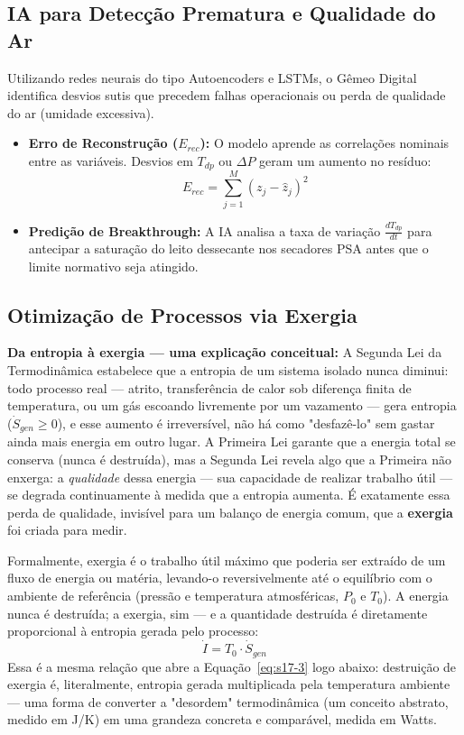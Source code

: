 \documentclass[12pt,a4paper]{article}
\numberwithin{equation}{section}
\numberwithin{table}{section}
\numberwithin{figure}{section}
\begin{document}
\subsection{IA para Detecção Prematura e Qualidade do Ar}

Utilizando redes neurais do tipo Autoencoders e LSTMs, o Gêmeo Digital identifica desvios sutis que precedem falhas operacionais ou perda de qualidade do ar (umidade excessiva).

\begin{itemize}
	\item \textbf{Erro de Reconstrução ($E_{rec}$):}
	O modelo aprende as correlações nominais entre as variáveis. Desvios em $T_{dp}$ ou $\Delta P$ geram um aumento no resíduo:
	\begin{equation}\label{eq:s17-2}
E_{rec} = \sum_{j=1}^{M} (z_j - \hat{z}_j)^2
\end{equation}
	
	\item \textbf{Predição de Breakthrough:} A IA analisa a taxa de variação $\frac{dT_{dp}}{dt}$ para antecipar a saturação do leito dessecante nos secadores PSA antes que o limite normativo seja atingido.
\end{itemize}

\subsection{Otimização de Processos via Exergia}

\textbf{Da entropia à exergia — uma explicação conceitual:} A Segunda Lei da Termodinâmica estabelece que a entropia de um sistema isolado nunca diminui: todo processo real — atrito, transferência de calor sob diferença finita de temperatura, ou um gás escoando livremente por um vazamento — gera entropia ($\dot{S}_{gen} \ge 0$), e esse aumento é irreversível, não há como "desfazê-lo" sem gastar ainda mais energia em outro lugar. A Primeira Lei garante que a energia total se conserva (nunca é destruída), mas a Segunda Lei revela algo que a Primeira não enxerga: a \textit{qualidade} dessa energia — sua capacidade de realizar trabalho útil — se degrada continuamente à medida que a entropia aumenta. É exatamente essa perda de qualidade, invisível para um balanço de energia comum, que a \textbf{exergia} foi criada para medir.

Formalmente, exergia é o trabalho útil máximo que poderia ser extraído de um fluxo de energia ou matéria, levando-o reversivelmente até o equilíbrio com o ambiente de referência (pressão e temperatura atmosféricas, $P_0$ e $T_0$). A energia nunca é destruída; a exergia, sim — e a quantidade destruída é diretamente proporcional à entropia gerada pelo processo:
$$ \dot{I} = T_0 \cdot \dot{S}_{gen} $$
Essa é a mesma relação que abre a Equação~\eqref{eq:s17-3} logo abaixo: destruição de exergia é, literalmente, entropia gerada multiplicada pela temperatura ambiente — uma forma de converter a "desordem" termodinâmica (um conceito abstrato, medido em J/K) em uma grandeza concreta e comparável, medida em Watts.
\end{document}
